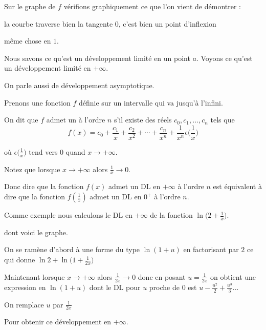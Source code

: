 Sur le graphe de $f$ vérifions graphiquement ce que l'on vient de démontrer :

\change

la courbe traverse bien la tangente $0$, c'est bien un point d'inflexion

\change

même chose en $1$.


\diapo

Nous savons ce qu'est un développement limité en un point $a$.
Voyons ce qu'est un développement limité en $+\infty$.

On parle aussi de développement asymptotique.

Prenons une fonction $f$ définie sur un intervalle qui va jusqu'à l'infini.

On dit que $f$ admet un  à l'ordre $n$
s'il existe des réels $c_0,c_1,\ldots,c_n$ tels que 
$$f(x)=c_0+\frac{c_1}{x}+\frac{c_2}{x^2}+\cdots+\frac{c_n}{x^n} 
+\frac{1}{x^n}\epsilon\big(\frac{1}{x}\big)$$

\change

où $\epsilon\big(\frac{1}{x}\big)$ tend vers $0$ quand $x\to+\infty$.


\change

Notez que lorsque $x\to +\infty$ alors $\frac{1}{x} \to 0$.

Donc dire que la fonction $f(x)$ admet un DL en $+\infty$ à l'ordre $n$ est équivalent à 
dire que la fonction $f(\frac{1}{x})$ admet un DL en $0^+$ à l'ordre $n$.

\change

Comme exemple nous calculons le DL en $+\infty$ de la fonction $\ln\big(2+\frac{1}{x}\big)$.

\change

dont voici le graphe.

\change

On se ramène d'abord à une forme du type $\ln(1+u)$ en factorisant par $2$
 ce qui donne $\ln2+\ln\big(1+\frac{1}{2x}\big)$

\change

Maintenant lorsque $x\to+\infty$ alors $\frac{1}{2x} \to 0$ donc en posant
$u=\frac{1}{2x}$ on obtient une expression en $\ln(1+u)$
dont le DL pour $u$ proche de $0$ est $u-\frac{u^2}{2}+\frac{u^3}{3}...$

On remplace $u$ par $\frac{1}{2x}$

Pour obtenir ce développement en $+\infty$.


